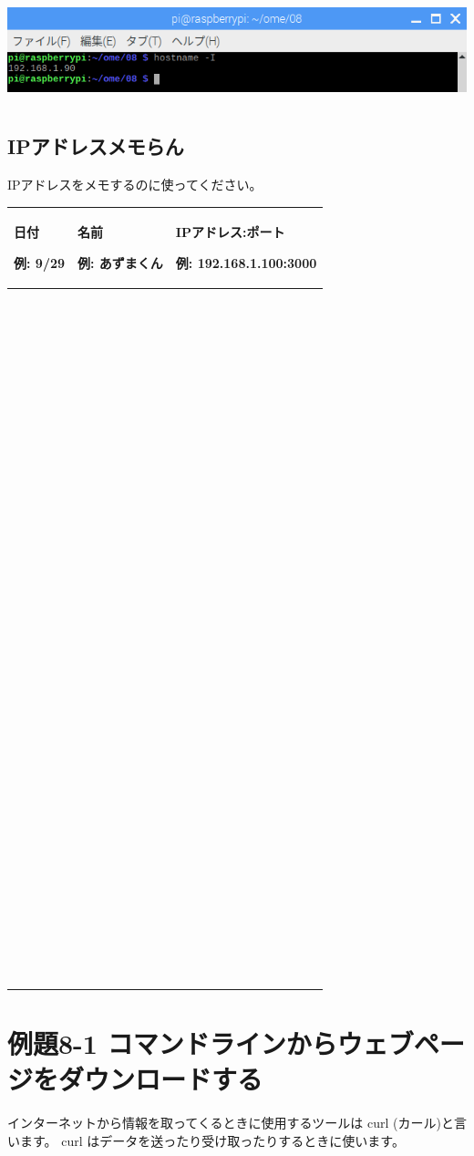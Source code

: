 \documentclass[a4paper,12pt,dvipdfmx]{jarticle}
\begin{document}
\begin{center}
\includegraphics[width=17.171cm,height=3.076cm]{textbook-img004.png}

\end{center}
\clearpage\subsection*{IPアドレスメモらん}
IPアドレスをメモするのに使ってください。

\begin{center}
\tablefirsthead{}
\tablehead{}
\tabletail{}
\tablelasttail{}
\begin{supertabular}{|m{5.4690003cm}|m{5.4690003cm}|m{5.4690003cm}|}
\hline
日付

例: 9/29 &
名前

例: あずまくん &
IPアドレス:ポート

例: 192.168.1.100:3000\\\hline
~

~

~

~
 &
~
 &
~
\\\hline
~

~

~

~
 &
~
 &
~
\\\hline
~

~

~

~
 &
~
 &
~
\\\hline
~

~

~

~
 &
~
 &
~
\\\hline
~

~

~

~
 &
~
 &
~
\\\hline
\end{supertabular}
\end{center}

\bigskip

\clearpage\section{例題8-1
コマンドラインからウェブページをダウンロードする}
インターネットから情報を取ってくるときに使用するツールは
curl (カール)と言います。 curl
はデータを送ったり受け取ったりするときに使います。
\end{document}
